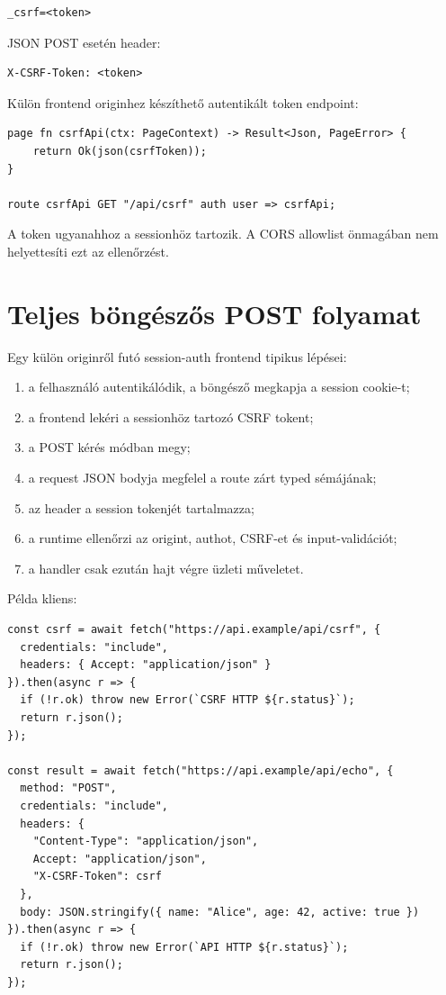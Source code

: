 \begin{lstlisting}
_csrf=<token>
\end{lstlisting}

JSON POST esetén header:

\begin{lstlisting}
X-CSRF-Token: <token>
\end{lstlisting}

Külön frontend originhez készíthető autentikált token endpoint:

\begin{lstlisting}[language=RWLang]
page fn csrfApi(ctx: PageContext) -> Result<Json, PageError> {
    return Ok(json(csrfToken));
}

route csrfApi GET "/api/csrf" auth user => csrfApi;
\end{lstlisting}

A token ugyanahhoz a sessionhöz tartozik. A CORS allowlist önmagában nem helyettesíti ezt az ellenőrzést.

\section{Teljes böngészős POST folyamat}

Egy külön  originről futó session-auth frontend tipikus lépései:

\begin{enumerate}
  \item a felhasználó autentikálódik, a böngésző megkapja a session cookie-t;
  \item a frontend lekéri a sessionhöz tartozó CSRF tokent;
  \item a POST kérés  módban megy;
  \item a request JSON bodyja megfelel a route zárt typed sémájának;
  \item az  header a session tokenjét tartalmazza;
  \item a runtime ellenőrzi az origint, authot, CSRF-et és input-validációt;
  \item a handler csak ezután hajt végre üzleti műveletet.
\end{enumerate}

Példa kliens:

\begin{lstlisting}
const csrf = await fetch("https://api.example/api/csrf", {
  credentials: "include",
  headers: { Accept: "application/json" }
}).then(async r => {
  if (!r.ok) throw new Error(`CSRF HTTP ${r.status}`);
  return r.json();
});

const result = await fetch("https://api.example/api/echo", {
  method: "POST",
  credentials: "include",
  headers: {
    "Content-Type": "application/json",
    Accept: "application/json",
    "X-CSRF-Token": csrf
  },
  body: JSON.stringify({ name: "Alice", age: 42, active: true })
}).then(async r => {
  if (!r.ok) throw new Error(`API HTTP ${r.status}`);
  return r.json();
});
\end{lstlisting}

